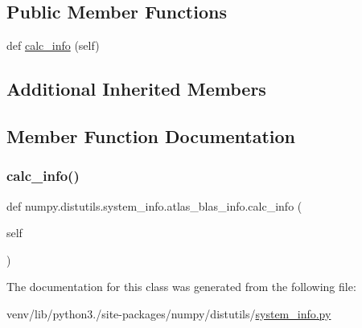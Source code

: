\subsection*{Public Member Functions}
\begin{DoxyCompactItemize}
\item 
def \hyperlink{classnumpy_1_1distutils_1_1system__info_1_1atlas__blas__info_af267ea1b67dbc5483ddce41f9ad5e9d0}{calc\+\_\+info} (self)
\end{DoxyCompactItemize}
\subsection*{Additional Inherited Members}


\subsection{Member Function Documentation}
\mbox{\label{classnumpy_1_1distutils_1_1system__info_1_1atlas__blas__info_af267ea1b67dbc5483ddce41f9ad5e9d0}} 
\subsubsection{\texorpdfstring{calc\+\_\+info()}{calc\_info()}}
{\footnotesize\ttfamily def numpy.\+distutils.\+system\+\_\+info.\+atlas\+\_\+blas\+\_\+info.\+calc\+\_\+info (\begin{DoxyParamCaption}\item[{}]{self }\end{DoxyParamCaption})}



The documentation for this class was generated from the following file\+:\begin{DoxyCompactItemize}
\item 
venv/lib/python3./site-\/packages/numpy/distutils/\hyperlink{system__info_8py}{system\+\_\+info.\+py}\end{DoxyCompactItemize}
